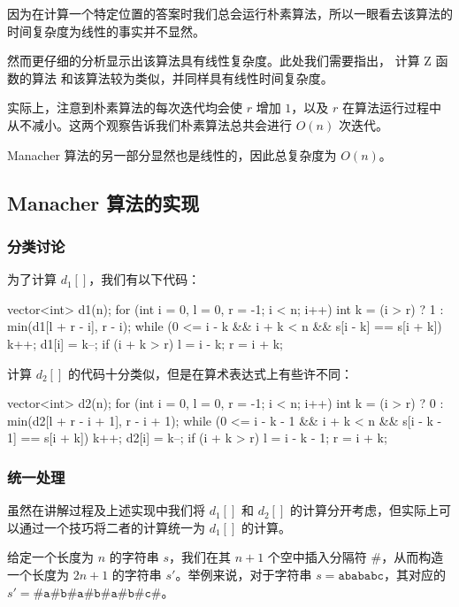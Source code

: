 因为在计算一个特定位置的答案时我们总会运行朴素算法，所以一眼看去该算法的时间复杂度为线性的事实并不显然。

然而更仔细的分析显示出该算法具有线性复杂度。此处我们需要指出， 计算 Z 函数的算法 和该算法较为类似，并同样具有线性时间复杂度。

实际上，注意到朴素算法的每次迭代均会使 $r$ 增加 $1$，以及 $r$ 在算法运行过程中从不减小。这两个观察告诉我们朴素算法总共会进行 $O(n)$ 次迭代。

Manacher 算法的另一部分显然也是线性的，因此总复杂度为 $O(n)$。

\subsection{Manacher 算法的实现}

\subsubsection{分类讨论}

为了计算 $d_1[]$，我们有以下代码：

\begin{cppcode}
vector<int> d1(n);
for (int i = 0, l = 0, r = -1; i < n; i++) {
  int k = (i > r) ? 1 : min(d1[l + r - i], r - i);
  while (0 <= i - k && i + k < n && s[i - k] == s[i + k]) {
    k++;
  }
  d1[i] = k--;
  if (i + k > r) {
    l = i - k;
    r = i + k;
  }
}
\end{cppcode}

计算 $d_2[]$ 的代码十分类似，但是在算术表达式上有些许不同：

\begin{cppcode}
vector<int> d2(n);
for (int i = 0, l = 0, r = -1; i < n; i++) {
  int k = (i > r) ? 0 : min(d2[l + r - i + 1], r - i + 1);
  while (0 <= i - k - 1 && i + k < n && s[i - k - 1] == s[i + k]) {
    k++;
  }
  d2[i] = k--;
  if (i + k > r) {
    l = i - k - 1;
    r = i + k;
  }
}
\end{cppcode}

\subsubsection{统一处理}

虽然在讲解过程及上述实现中我们将 $d_1[]$ 和 $d_2[]$ 的计算分开考虑，但实际上可以通过一个技巧将二者的计算统一为 $d_1[]$ 的计算。

给定一个长度为 $n$ 的字符串 $s$，我们在其 $n + 1$ 个空中插入分隔符 $\#$，从而构造一个长度为 $2n + 1$ 的字符串 $s'$。举例来说，对于字符串 $s = \mathtt{abababc}$，其对应的 $s' = \mathtt{\#a\#b\#a\#b\#a\#b\#c\#}$。

